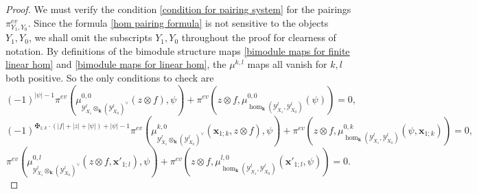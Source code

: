 \documentclass[10pt,a4paper]{amsart}
\def\K{{\mathbf{k}}}
\def\Y{\mathcal{Y}}
\begin{document}
\begin{proof}
We must verify the condition \eqref{condition for pairing system} for the pairings $\pi^{ev}_{Y_{1}, Y_{0}}$.
Since the formula \eqref{hom pairing formula} is not sensitive to the objects $Y_{1}, Y_{0}$,
we shall omit the subscripts $Y_{1}, Y_{0}$ throughout the proof for clearness of notation.
By definitions of the bimodule structure maps \eqref{bimodule maps for finite linear hom} and \eqref{bimodule maps for linear hom},
the $\mu^{k, l}$ maps all vanish for $k, l$ both positive.
So the only conditions to check are
\begin{equation}\label{pairing condition ev 0}
(-1)^{|\psi| - 1} \pi^{ev}( \mu_{\Y^{l}_{X_{1}} \otimes_{\K} (\Y^{l}_{X_{0}})^{\vee}}^{0, 0}(z \otimes f), \psi) 
+ \pi^{ev}(z \otimes f, \mu_{\hom_{\K}(\Y^{l}_{X_{1}}, \Y^{l}_{X_{0}})}^{0, 0}(\psi)) = 0,
\end{equation}
\begin{equation}\label{pairing condition ev 1}
(-1)^{\maltese_{1;k} \cdot (|f|+|z|+|\psi|) + |\psi| - 1} \pi^{ev}(\mu_{\Y^{l}_{X_{1}} \otimes_{\K} (\Y^{l}_{X_{0}})^{\vee}}^{k, 0}(\mathbf{x}_{1;k}, z \otimes f), \psi) 
+ \pi^{ev}(z \otimes f, \mu_{\hom_{\K}(\Y^{l}_{X_{1}}, \Y^{l}_{X_{0}})}^{0, k}(\psi, \mathbf{x}_{1;k})) = 0,
\end{equation}
\begin{equation}\label{pairing condition ev 2}
\pi^{ev}(\mu_{\Y^{l}_{X_{1}} \otimes_{\K} (\Y^{l}_{X_{0}})^{\vee}}^{0, l}(z \otimes f, \mathbf{x}'_{1;l}), \psi) 
+ \pi^{ev}(z \otimes f, \mu_{\hom_{\K}(\Y^{l}_{X_{1}}, \Y^{l}_{X_{0}})}^{l, 0}(\mathbf{x}'_{1;l}, \psi)) = 0.
\end{equation}


\end{proof}
\end{document}
